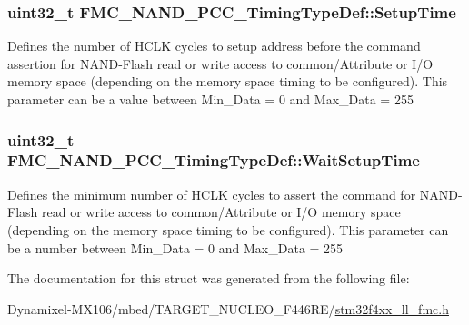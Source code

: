\subsubsection[{\texorpdfstring{Setup\+Time}{SetupTime}}]{\setlength{\rightskip}{0pt plus 5cm}uint32\+\_\+t F\+M\+C\+\_\+\+N\+A\+N\+D\+\_\+\+P\+C\+C\+\_\+\+Timing\+Type\+Def\+::\+Setup\+Time}\hypertarget{struct_f_m_c___n_a_n_d___p_c_c___timing_type_def_a7f999bb43ce5bd642439b90056dd2819}{}\label{struct_f_m_c___n_a_n_d___p_c_c___timing_type_def_a7f999bb43ce5bd642439b90056dd2819}
Defines the number of H\+C\+LK cycles to setup address before the command assertion for N\+A\+N\+D-\/\+Flash read or write access to common/\+Attribute or I/O memory space (depending on the memory space timing to be configured). This parameter can be a value between Min\+\_\+\+Data = 0 and Max\+\_\+\+Data = 255 
\subsubsection[{\texorpdfstring{Wait\+Setup\+Time}{WaitSetupTime}}]{\setlength{\rightskip}{0pt plus 5cm}uint32\+\_\+t F\+M\+C\+\_\+\+N\+A\+N\+D\+\_\+\+P\+C\+C\+\_\+\+Timing\+Type\+Def\+::\+Wait\+Setup\+Time}\hypertarget{struct_f_m_c___n_a_n_d___p_c_c___timing_type_def_abec51342237cf19aacfbbdfa866648d9}{}\label{struct_f_m_c___n_a_n_d___p_c_c___timing_type_def_abec51342237cf19aacfbbdfa866648d9}
Defines the minimum number of H\+C\+LK cycles to assert the command for N\+A\+N\+D-\/\+Flash read or write access to common/\+Attribute or I/O memory space (depending on the memory space timing to be configured). This parameter can be a number between Min\+\_\+\+Data = 0 and Max\+\_\+\+Data = 255 

The documentation for this struct was generated from the following file\+:\begin{DoxyCompactItemize}
\item 
Dynamixel-\/\+M\+X106/mbed/\+T\+A\+R\+G\+E\+T\+\_\+\+N\+U\+C\+L\+E\+O\+\_\+\+F446\+R\+E/\hyperlink{stm32f4xx__ll__fmc_8h}{stm32f4xx\+\_\+ll\+\_\+fmc.\+h}\end{DoxyCompactItemize}
